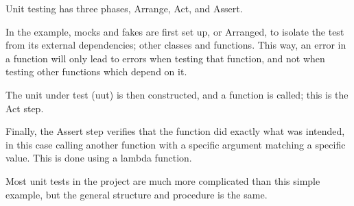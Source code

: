 Unit testing has three phases, Arrange, Act, and Assert. 

In the example, mocks and fakes are first set up, or Arranged, to isolate the test from its external dependencies; other classes and functions. This way, an error in a function will only lead to errors when testing that function, and not when testing other functions which depend on it. 

The unit under test (uut) is then constructed, and a function is called; this is the Act step. 

Finally, the Assert step verifies that the function did exactly what was intended, in this case calling another function with a specific argument matching a specific value. This is done using a lambda function.

Most unit tests in the project are much more complicated than this simple example, but the general structure and procedure is the same. 